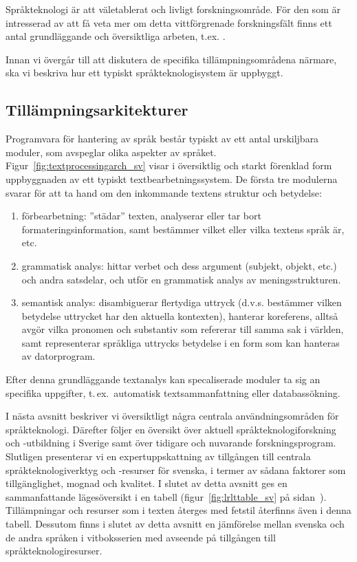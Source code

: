 \begin{multicols}{2}
Språkteknologi är att väletablerat och livligt forskningsområde. För
den som är intresserad av att få veta mer om detta vittförgrenade
forskningsfält finns ett antal grundläggande och översiktliga arbeten,
t.ex.
\cite{jurafsky-martin01,manning-schuetze1,lt-world1,lt-survey1}.

Innan vi övergår till att diskutera de specifika tillämpningsområdena
närmare, ska vi beskriva hur ett typiskt språkteknologisystem är
uppbyggt.


\subsection{Tillämpnings\-arkitekturer}

Programvara för hantering av språk består typiskt av ett antal
urskiljbara moduler, som avspeglar olika aspekter av
språket. Figur~\ref{fig:textprocessingarch_sv} visar i översiktlig och
starkt förenklad form uppbyggnaden av ett typiskt
textbearbetningssystem. De första tre modulerna svarar för att ta hand
om den inkommande textens struktur och betydelse: \\

\begin{enumerate}
\item förbearbetning: ''städar'' texten, analyserar eller tar bort
  formateringsinformation, samt bestämmer vilket eller vilka textens
  språk är, etc.
\item grammatisk analys: hittar verbet och dess argument (subjekt,
  objekt, etc.) och andra satsdelar, och utför en grammatisk analys av
  meningsstrukturen.
\item semantisk analys: disambiguerar flertydiga uttryck
  (d.v.s. bestämmer vilken betydelse uttrycket har den aktuella
  kontexten), hanterar koreferens, alltså avgör vilka pronomen och
  substantiv som refererar till samma sak i världen, samt
  representerar språkliga uttrycks betydelse i en form som kan
  hanteras av datorprogram.
\end{enumerate}

Efter denna grundläggande textanalys kan specaliserade moduler ta sig
an specifika uppgifter, t.\,ex.~automatisk textsammanfattning eller
databassökning.

I nästa avsnitt beskriver vi översiktligt några centrala
användningsområden för språkteknologi. Därefter följer en översikt
över aktuell språkteknologiforskning och -utbildning i Sverige samt
över tidigare och nuvarande forskningsprogram. Slutligen presenterar
vi en expertuppskattning av tillgången till centrala
språkteknologiverktyg och -resurser för svenska, i termer av sådana
faktorer som tillgänglighet, mognad och kvalitet. I slutet av detta
avsnitt ges en sammanfattande lägesöversikt i en tabell
(figur~\ref{fig:lrlttable_sv} på
sidan~\pageref{fig:lrlttable_sv}). Tillämpningar och resurser som i
texten återges med fetstil återfinns även i denna tabell. Dessutom
finns i slutet av detta avsnitt en jämförelse mellan svenska och de
andra språken i vitboksserien med avseende på tillgången till
språkteknologiresurser.



\end{multicols}
